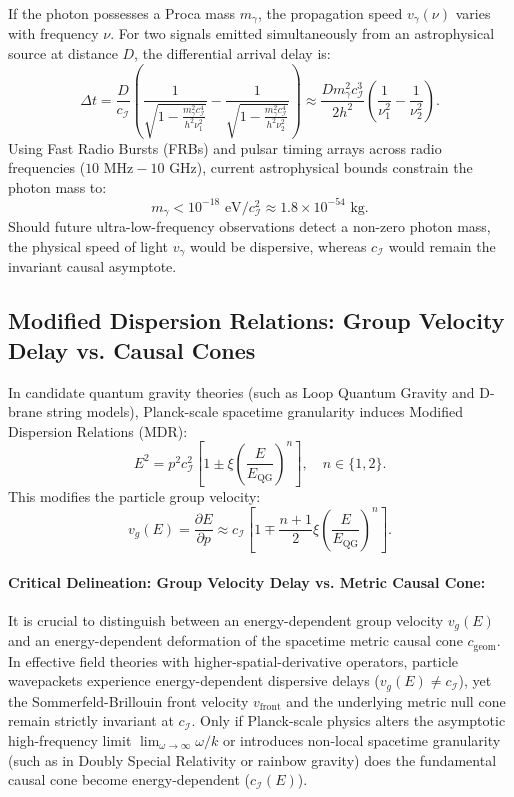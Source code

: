 \documentclass[11pt,a4paper]{article}
\begin{document}
If the photon possesses a Proca mass $m_\gamma$, the propagation speed $v_\gamma(\nu)$ varies with frequency $\nu$. For two signals emitted simultaneously from an astrophysical source at distance $D$, the differential arrival delay is:
\begin{equation}
\Delta t = \frac{D}{c_{\mathcal{I}}} \left( \frac{1}{\sqrt{1 - \frac{m_\gamma^2 c_{\mathcal{I}}^4}{h^2 \nu_1^2}}} - \frac{1}{\sqrt{1 - \frac{m_\gamma^2 c_{\mathcal{I}}^4}{h^2 \nu_2^2}}} \right) \approx \frac{D m_\gamma^2 c_{\mathcal{I}}^3}{2 h^2} \left( \frac{1}{\nu_1^2} - \frac{1}{\nu_2^2} \right).
\end{equation}
Using Fast Radio Bursts (FRBs) and pulsar timing arrays across radio frequencies ($10\text{ MHz} - 10\text{ GHz}$), current astrophysical bounds constrain the photon mass to:
\begin{equation}
m_\gamma < 10^{-18}\text{ eV}/c_{\mathcal{I}}^2 \approx 1.8 \times 10^{-54}\text{ kg}.
\end{equation}
Should future ultra-low-frequency observations detect a non-zero photon mass, the physical speed of light $v_\gamma$ would be dispersive, whereas $c_{\mathcal{I}}$ would remain the invariant causal asymptote.

\subsection{Modified Dispersion Relations: Group Velocity Delay vs. Causal Cones}

In candidate quantum gravity theories (such as Loop Quantum Gravity and D-brane string models), Planck-scale spacetime granularity induces Modified Dispersion Relations (MDR):
\begin{equation}
E^2 = p^2 c_{\mathcal{I}}^2 \left[ 1 \pm \xi \left( \frac{E}{E_{\text{QG}}} \right)^n \right], \quad n \in \{1, 2\}.
\end{equation}
This modifies the particle group velocity:
\begin{equation}
v_g(E) = \frac{\partial E}{\partial p} \approx c_{\mathcal{I}} \left[ 1 \mp \frac{n+1}{2} \xi \left( \frac{E}{E_{\text{QG}}} \right)^n \right].
\end{equation}

\paragraph{Critical Delineation: Group Velocity Delay vs. Metric Causal Cone:}
It is crucial to distinguish between an energy-dependent group velocity $v_g(E)$ and an energy-dependent deformation of the spacetime metric causal cone $c_{\text{geom}}$. In effective field theories with higher-spatial-derivative operators, particle wavepackets experience energy-dependent dispersive delays ($v_g(E) \neq c_{\mathcal{I}}$), yet the Sommerfeld-Brillouin front velocity $v_{\text{front}}$ and the underlying metric null cone remain strictly invariant at $c_{\mathcal{I}}$. Only if Planck-scale physics alters the asymptotic high-frequency limit $\lim_{\omega \to \infty} \omega / k$ or introduces non-local spacetime granularity (such as in Doubly Special Relativity or rainbow gravity) does the fundamental causal cone become energy-dependent ($c_{\mathcal{I}}(E)$).
\end{document}
